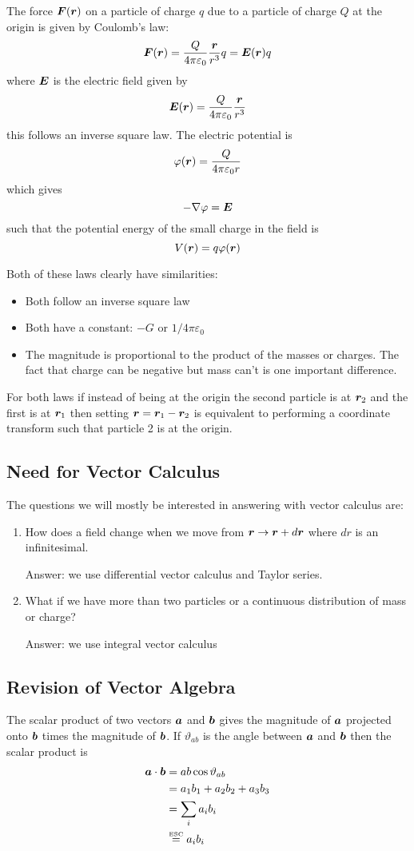 \documentclass{article}
\newcommand{\esc}{\overset{\text{\tiny ESC}}{=}}
\begin{document}
    
    The force \(\bm{F}(\bm{r})\) on a particle of charge \(q\) due to a particle of charge \(Q\) at the origin is given by Coulomb's law:
    \[\bm{F}(\bm{r}) = \frac{Q}{4\pi\varepsilon_0}\frac{\bm{r}}{r^3}q = \bm{E}(\bm{r})q\]
    where \(\bm{E}\) is the electric field given by
    \[\bm{E}(\bm{r}) = \frac{Q}{4\pi\varepsilon_0}\frac{\bm{r}}{r^3}\]
    this follows an inverse square law.
    The electric potential is
    \[\varphi(\bm{r}) = \frac{Q}{4\pi\varepsilon_0r}\]
    which gives
    \[-\nabla \varphi = \bm{E}\]
    such that the potential energy of the small charge in the field is
    \[V(\bm{r}) = q\varphi(\bm{r})\]
    
    Both of these laws clearly have similarities:
    \begin{itemize}
        \item Both follow an inverse square law
        \item Both have a constant: \(-G\) or \(1/4\pi\varepsilon_0\)
        \item The magnitude is proportional to the product of the masses or charges.
        The fact that charge can be negative but mass can't is one important difference.
    \end{itemize}
    For both laws if instead of being at the origin the second particle is at \(\bm{r}_2\) and the first is at \(\bm{r}_1\) then setting \(\bm{r} = \bm{r}_1 - \bm{r}_2\) is equivalent to performing a coordinate transform such that particle 2 is at the origin.
    
    \subsection{Need for Vector Calculus}
    The questions we will mostly be interested in answering with vector calculus are:
    \begin{enumerate}
        \item How does a field change when we move from \(\bm{r}\to \bm{r} + d\bm{r}\) where \(dr\) is an infinitesimal.
        
        Answer: we use differential vector calculus and Taylor series.
        \item What if we have more than two particles or a continuous distribution of mass or charge?
        
        Answer: we use integral vector calculus
    \end{enumerate}
    
    \subsection{Revision of Vector Algebra}
    The scalar product of two vectors \(\bm{a}\) and \(\bm{b}\) gives the magnitude of \(\bm{a}\) projected onto \(\bm{b}\) times the magnitude of \(\bm{b}\).
    If \(\vartheta_{ab}\) is the angle between \(\bm{a}\) and \(\bm{b}\) then the scalar product is
    \begin{align*}
        \vv a\cdot \vv b &= ab\cos\vartheta_{ab}\\
        &= a_1b_1 + a_2b_2 + a_3b_3\\
        &= \sum_i a_ib_i\\
        &\esc a_ib_i
    \end{align*}
    
\end{document}

